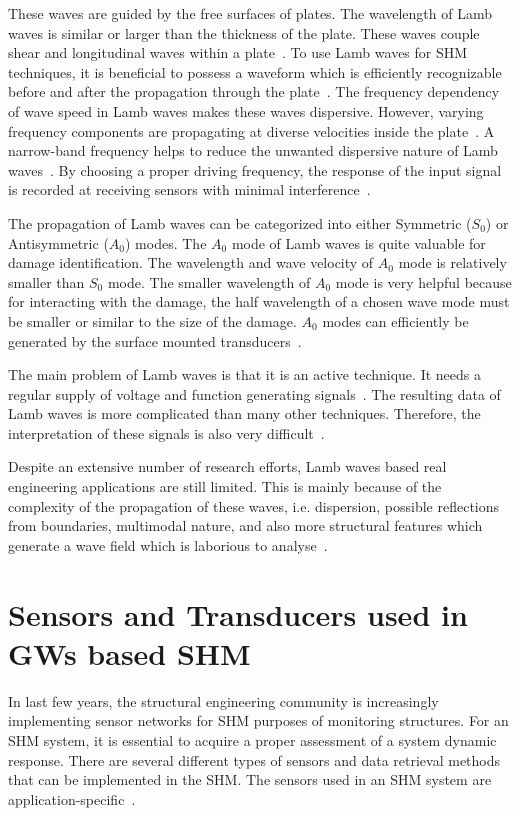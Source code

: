 \documentclass[b5paper, 11pt, titlepage]{book}
\begin{document}
These waves are guided by the free surfaces of plates. The wavelength of Lamb waves is similar or larger than the thickness of the plate. These waves couple shear and longitudinal waves within a plate~\cite{Farrar2012}. To use Lamb waves for SHM techniques, it is beneficial to possess a waveform which is efficiently recognizable before and after the propagation through the plate~\cite{Farrar2012}. The frequency dependency of wave speed in Lamb waves makes these waves dispersive. However, varying frequency components are propagating at diverse velocities inside the plate~\cite{Farrar2012}. A narrow-band frequency helps to reduce the unwanted dispersive nature of Lamb waves~\cite{Kessler2002}. By choosing a proper driving frequency, the response of the input signal is recorded at receiving sensors with minimal interference~\cite{Farrar2012}. 

The propagation of Lamb waves can be categorized into either Symmetric ($S_0$) or Antisymmetric ($A_0$) modes. The $A_0$ mode of Lamb waves is quite valuable for damage identification. The wavelength and wave velocity of $A_0$ mode is relatively smaller than $S_0$ mode. The smaller wavelength of $A_0$ mode is very helpful because for interacting with the damage, the half wavelength of a chosen wave mode must be smaller or similar to the size of the damage. $A_0$ modes can efficiently be generated by the surface mounted transducers~\cite{Ricci2016}.  

The main problem of Lamb waves is that it is an active technique. It needs a regular supply of voltage and function generating signals~\cite{MMaia, Kessler2002}. The resulting data of Lamb waves is more complicated than many other techniques. Therefore, the interpretation of these signals is also very difficult~\cite{Kessler2002}.

Despite an extensive number of research efforts, Lamb waves based real engineering applications are still limited. This is mainly because of the complexity of the propagation of these waves, i.e. dispersion, possible reflections from boundaries, multimodal nature, and also more structural features which generate a wave field which is laborious to analyse~\cite{stepinski2013advanced}.

\section{Sensors and Transducers used in GWs based SHM}
In last few years, the structural engineering community is increasingly implementing sensor networks for SHM purposes of monitoring structures. For an SHM system, it is essential to acquire a proper assessment of a system dynamic response. There are several different types of sensors and data retrieval methods that can be implemented in the SHM. The sensors used in an SHM system are application-specific~\cite{Farrar2012}.
\end{document}
